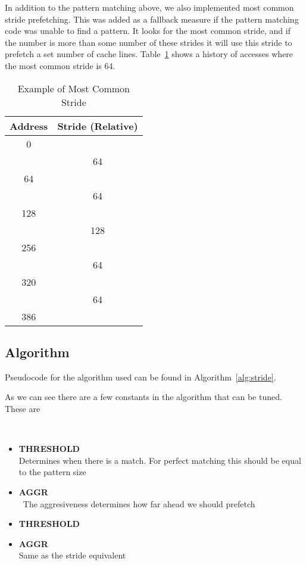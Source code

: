 In addition to the pattern matching above, we also implemented most common stride
prefetching. This was added as a fallback measure if the pattern matching code
was unable to find a pattern.
It looks for the most common stride, and if the number
is more than some number
of these strides it will use this stride to prefetch a
set number of cache lines.
Table~\ref{table:mcs} shows a history of accesses
where the most common stride is 64.
\begin{table}
	\caption{Example of Most Common Stride}
	\centering
	\label{table:mcs}
	\begin{tabular}{c|c}
		\bfseries Address & \bfseries Stride (Relative)\\
		\hline
		0   & \\
		    & 64\\
		64  & \\
		    & 64\\
		128 & \\
		    & 128\\
		256 & \\
		    & 64\\
		320 & \\
		    & 64\\
		386 & \\
	\end{tabular}
\end{table}

\subsection{Algorithm}

Pseudocode for the algorithm used can be found in Algorithm~\ref{alg:stride}.

As we can see there are a few constants in the algorithm that can be
tuned. These are

~
\begin{itemize}
	\item \textbf{ THRESHOLD} \\ Determines when there is a match.
	For perfect matching this should be equal to the pattern size \\
	\item \textbf{ AGGR} \\ The aggresiveness determines how far
	ahead we should prefetch \\
	\item \textbf{ THRESHOLD} \\
	\item \textbf{ AGGR} \\  Same as the stride equivalent \\
\end{itemize}

